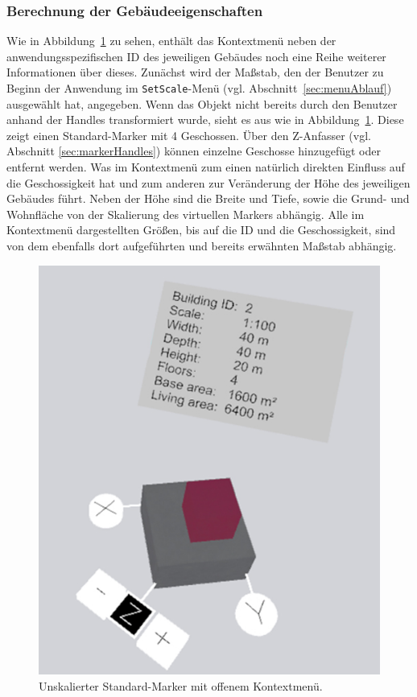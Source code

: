 \subsubsection{Berechnung der Gebäudeeigenschaften} \label{sec:KontextMenuInhalt}
Wie in Abbildung~\ref{fig:standardMarker} zu sehen, enthält das Kontextmenü neben der anwendungsspezifischen ID des jeweiligen Gebäudes noch eine Reihe weiterer Informationen über dieses.  Zunächst wird der Maßstab, den der Benutzer zu Beginn der Anwendung im \texttt{SetScale}-Menü (vgl. Abschnitt~\ref{sec:menuAblauf}) ausgewählt hat, angegeben. Wenn das Objekt nicht bereits durch den Benutzer anhand der Handles transformiert wurde, sieht es aus wie in Abbildung~\ref{fig:standardMarker}. Diese zeigt einen Standard-Marker mit 4 Geschossen. Über den Z-Anfasser (vgl. Abschnitt \ref{sec:markerHandles}) können einzelne Geschosse hinzugefügt oder entfernt werden. Was im Kontextmenü zum einen natürlich direkten Einfluss auf die Geschossigkeit hat und zum anderen zur Veränderung der Höhe des jeweiligen Gebäudes führt. Neben der Höhe sind die Breite und Tiefe, sowie die Grund- und Wohnfläche von der Skalierung des virtuellen Markers abhängig. Alle im Kontextmenü dargestellten Größen, bis auf die ID und die Geschossigkeit, sind von dem ebenfalls dort aufgeführten und bereits erwähnten Maßstab abhängig. 

\begin{figure}
	\centering
	\includegraphics[scale=.3]{Bilder/Neue Screenshots/StandardMarker.jpg}
	\caption{Unskalierter Standard-Marker mit offenem Kontextmenü.}
	\label{fig:standardMarker}
\end{figure}

